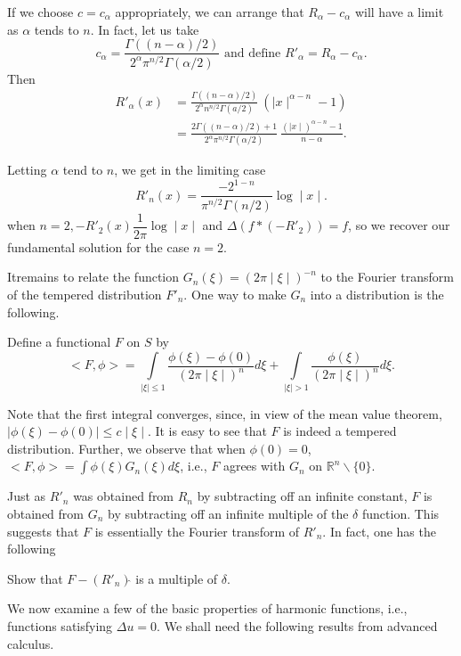If we choose $c=c_\alpha$ appropriately, we can arrange that $R_\alpha
- c_\alpha$ will have a limit as $\alpha$ tends to $n$. In fact, let
us take 
$$
c_\alpha =\frac{\Gamma((n-\alpha)/2)}{2^\alpha
  \pi^{n/2}\Gamma(\alpha/2)} \text{ and define } R'_{\alpha} =
R_\alpha - c_\alpha. 
$$
Then  
\begin{align*}
  R'_\alpha(x) & = \frac{\Gamma((n-\alpha)/2)}{2^\alpha n^{n/2}
    \Gamma(a/2)} ~ (\mid x \mid^{\alpha-n}-1)\\ 
  & = \frac{2\Gamma((n-\alpha)/2)+1}{2^\alpha \pi^{n/2}\Gamma(\alpha /
    2)} ~ \frac{(\mid x \mid)^{\alpha-n}-1}{n-\alpha}. 
\end{align*}

Letting $\alpha$ tend to $n$, we get in the limiting case
$$
R'_n(x) = \frac{-2^{1-n}}{\pi^{n/2}\Gamma(n/2)} \log \mid x \mid.
$$
when $n=2, -R'_2(x) \dfrac{1}{2\pi} \log \mid x \mid$  and 
$\Delta (f * (-R'_2)) = f$, so we recover our fundamental solution for
the case $n=2$. 

It\pageoriginale remains to relate the function $G_n(\xi)=(2\pi\mid \xi \mid)^{-n}$
to the Fourier transform of the tempered distribution $F'_n$. One way
to make $G_n$ into a distribution is the following. 

Define a functional $F$ on $S$ by
$$
< F,\phi > = \int\limits_{\mid \xi \mid \le 1}
\frac{\phi(\xi)-\phi(0)}{(2\pi\mid \xi \mid)^n} d\xi +
\int\limits_{\mid \xi \mid > 1} \frac{ \phi (\xi) }{ (2\pi \mid \xi
  \mid )^n} d\xi. 
$$

Note that the first integral converges, since, in view of the mean
value theorem, $\mid \phi (\xi) - \phi (0) \mid \le c \mid \xi
\mid$. It is easy to see that $F$ is indeed a tempered
distribution. Further, we observe that when $\phi (0) = 0$, 
$< F, \phi >= \int \phi (\xi) G_n (\xi) d\xi$, i.e., $F$  agrees with
 $G_n$ on $\mathbb{R}^n\backslash \{0\}$. 

Just as $R'_n$ was obtained from $R_n$ by subtracting off an infinite
constant, $F$ is obtained from $G_n$ by subtracting off an infinite
multiple of the $\delta$ function. This suggests that $F$ is
essentially the Fourier transform of $R'_n$. In fact, one has the
following  

\begin{exercise}%
  Show that $F-(R'_n)\hat{} $ is a multiple of $\delta$.
  
  We now examine a few of the basic properties of harmonic functions,
  i.e., functions satisfying $\Delta u=0$. We shall need the following
  results from advanced calculus.  
\end{exercise}

